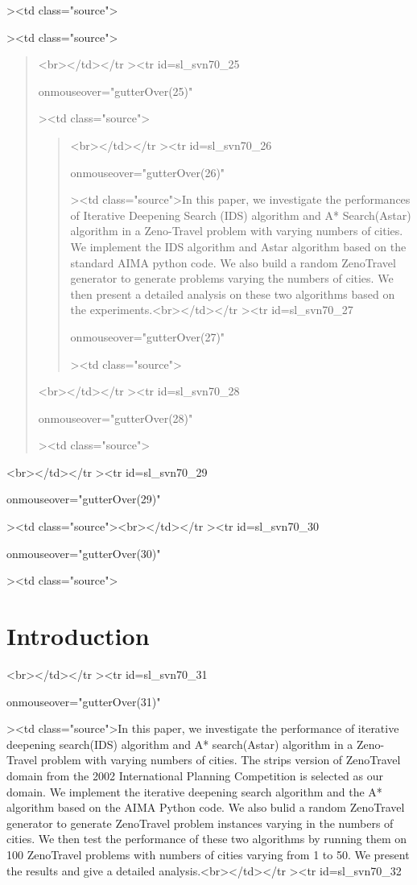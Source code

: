><td class="source">\documentclass[letterpaper]{article}<br></td></tr
\begin{document}
><td class="source">\begin{abstract}<br></td></tr
><tr
id=sl_svn70_25

 onmouseover="gutterOver(25)"

><td class="source">\begin{quote}<br></td></tr
><tr
id=sl_svn70_26

 onmouseover="gutterOver(26)"

><td class="source">In this paper, we investigate the performances of Iterative Deepening Search (IDS) algorithm and A* Search(Astar) algorithm in a Zeno-Travel problem with varying numbers of cities. We implement the IDS algorithm and Astar algorithm based on the standard AIMA python code. We also build a random ZenoTravel generator to generate problems varying the numbers of cities. We then present a detailed analysis on these two algorithms based on the experiments.<br></td></tr
><tr
id=sl_svn70_27

 onmouseover="gutterOver(27)"

><td class="source">\end{quote}<br></td></tr
><tr
id=sl_svn70_28

 onmouseover="gutterOver(28)"

><td class="source">\end{abstract}<br></td></tr
><tr
id=sl_svn70_29

 onmouseover="gutterOver(29)"

><td class="source"><br></td></tr
><tr
id=sl_svn70_30

 onmouseover="gutterOver(30)"

><td class="source">\section{Introduction}<br></td></tr
><tr
id=sl_svn70_31

 onmouseover="gutterOver(31)"

><td class="source">In this paper, we investigate the performance of iterative deepening search(IDS) algorithm and A* search(Astar) algorithm in a Zeno-Travel problem with varying numbers of cities. The strips version of ZenoTravel domain from the 2002 International Planning Competition is selected as our domain. We implement the iterative deepening search algorithm and the A* algorithm based on the AIMA Python code. We also bulid a random ZenoTravel generator to generate ZenoTravel problem instances varying in the numbers of cities. We then test the performance of these two algorithms by running them on 100   ZenoTravel problems with numbers of cities varying from 1 to 50. We present the results and give a detailed analysis.<br></td></tr
><tr
id=sl_svn70_32
\end{document}

